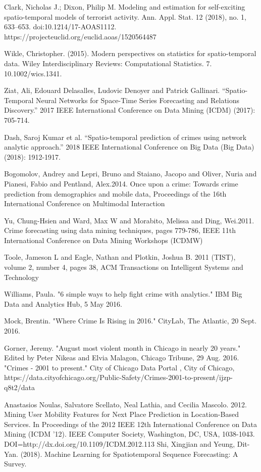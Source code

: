 \documentclass[conference]{IEEEtran}
\begin{document}
\begin{thebibliography}{00}
	Clark, Nicholas J.; Dixon, Philip M. Modeling and estimation for self-exciting spatio-temporal models of terrorist activity. Ann. Appl. Stat. 12 (2018), no. 1, 633--653. doi:10.1214/17-AOAS1112. https://projecteuclid.org/euclid.aoas/1520564487
	

	
	Wikle, Christopher. (2015). Modern perspectives on statistics for spatio-temporal data. Wiley Interdisciplinary Reviews: Computational Statistics. 7. 10.1002/wics.1341.
	 
	Ziat, Ali, Edouard Delasalles, Ludovic Denoyer and Patrick Gallinari. “Spatio-Temporal Neural Networks for Space-Time Series Forecasting and Relations Discovery.” 2017 IEEE International Conference on Data Mining (ICDM) (2017): 705-714.
	
	Dash, Saroj Kumar et al. “Spatio-temporal prediction of crimes using network analytic approach.” 2018 IEEE International Conference on Big Data (Big Data) (2018): 1912-1917.
	
	Bogomolov, Andrey and Lepri, Bruno and Staiano, Jacopo and Oliver,
	Nuria and Pianesi, Fabio and Pentland, Alex.2014. Once upon a crime:
	Towards crime prediction from demographics and mobile data,
	Proceedings of the 16th International Conference on Multimodal
	Interaction
	
	Yu, Chung-Hsien and Ward, Max W and Morabito, Melissa and Ding,
	Wei.2011. Crime forecasting using data mining techniques, pages
	779-786, IEEE 11th International Conference on Data Mining Workshops
	(ICDMW)
	
	Toole, Jameson L and Eagle, Nathan and Plotkin, Joshua B. 2011 (TIST),
	volume 2, number 4, pages 38, ACM Transactions on Intelligent Systems
	and Technology
	
	Williams, Paula. "6 simple ways to help fight crime with analytics."
	IBM Big Data and Analytics Hub, 5 May 2016.
	
	Mock, Brentin. "Where Crime Is Rising in 2016." CityLab, The Atlantic,
	20 Sept. 2016.
	
	Gorner, Jeremy. "August most violent month in Chicago in nearly 20
	years." Edited by Peter Nikeas and Elvia Malagon, Chicago Tribune, 29
	Aug. 2016.
		"Crimes - 2001 to present." City of Chicago Data Portal , City of Chicago, https://data.cityofchicago.org/Public-Safety/Crimes-2001-to-present/ijzp-q8t2/data
	
	Anastasios Noulas, Salvatore Scellato, Neal Lathia, and Cecilia Mascolo. 2012. Mining User Mobility Features for Next Place Prediction in Location-Based Services. In Proceedings of the 2012 IEEE 12th International Conference on Data Mining (ICDM '12). IEEE Computer Society, Washington, DC, USA, 1038-1043. DOI=http://dx.doi.org/10.1109/ICDM.2012.113
	Shi, Xingjian and Yeung, Dit-Yan. (2018). Machine Learning for Spatiotemporal Sequence Forecasting: A Survey. 
	
	
\end{thebibliography}
\end{document}
